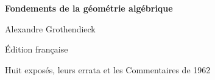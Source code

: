 \documentclass[11pt,twoside,openany]{book}
\begin{document}
\frontmatter
\begin{titlepage}
  \centering
  \vspace*{0.16\textheight}
  {\Huge\bfseries Fondements de la géométrie algébrique\par}
  \vspace{1.2\baselineskip}
  {\Large Alexandre Grothendieck\par}
  \vfill
  {\large Édition française\par}
  \vspace{0.5\baselineskip}
  {\normalsize Huit exposés, leurs errata et les Commentaires de 1962\par}
\end{titlepage}
\tableofcontents
\mainmatter

















\end{document}
